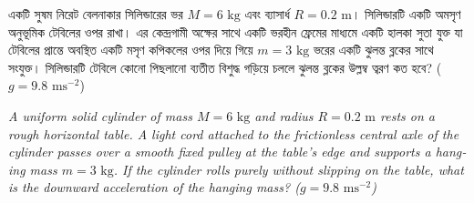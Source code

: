\documentclass[12pt, a4paper]{article}
\begin{document}
\begin{tcolorbox}[questionbox={প্রশ্ন (Question) 12}]
    \noindent
    একটি সুষম নিরেট বেলনাকার সিলিন্ডারের ভর $M = 6\text{ kg}$ এবং ব্যাসার্ধ $R = 0.2\text{ m}$। সিলিন্ডারটি একটি অমসৃণ অনুভূমিক টেবিলের ওপর রাখা। এর কেন্দ্রগামী অক্ষের সাথে একটি ভরহীন ফ্রেমের মাধ্যমে একটি হালকা সুতা যুক্ত যা টেবিলের প্রান্তে অবস্থিত একটি মসৃণ কপিকলের ওপর দিয়ে গিয়ে $m = 3\text{ kg}$ ভরের একটি ঝুলন্ত ব্লকের সাথে সংযুক্ত। সিলিন্ডারটি টেবিলে কোনো পিছলানো ব্যতীত বিশুদ্ধ গড়িয়ে চললে ঝুলন্ত ব্লকের উল্লম্ব ত্বরণ কত হবে? ($g = 9.8\text{ ms}^{-2}$)
    
    \vspace{0.8em}
    \begin{english}
    \noindent\textit{\color{darkgray}
    A uniform solid cylinder of mass $M = 6\text{ kg}$ and radius $R = 0.2\text{ m}$ rests on a rough horizontal table. A light cord attached to the frictionless central axle of the cylinder passes over a smooth fixed pulley at the table's edge and supports a hanging mass $m = 3\text{ kg}$. If the cylinder rolls purely without slipping on the table, what is the downward acceleration of the hanging mass? ($g = 9.8\text{ ms}^{-2}$)
    }
    \end{english}
\end{tcolorbox}
\end{document}

